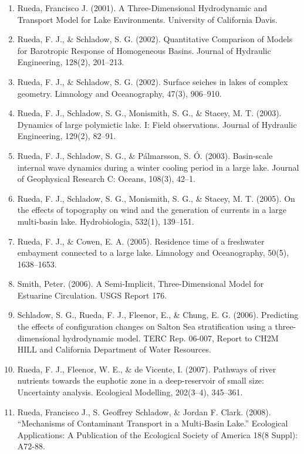 \begin{enumerate}
    \item Rueda, Francisco J. (2001). A Three-Dimensional Hydrodynamic and Transport Model for Lake Environments. University of California Davis.
    \item Rueda, F. J., \& Schladow, S. G. (2002). Quantitative Comparison of Models for Barotropic Response of Homogeneous Basins. Journal of Hydraulic Engineering, 128(2), 201–213.
    \item Rueda, F. J., \& Schladow, S. G. (2002). Surface seiches in lakes of complex geometry. Limnology and Oceanography, 47(3), 906–910.
    \item Rueda, F. J., Schladow, S. G., Monismith, S. G., \& Stacey, M. T. (2003). Dynamics of large polymictic lake. I: Field observations. Journal of Hydraulic Engineering, 129(2), 82–91.
    \item Rueda, F. J., Schladow, S. G., \& Pálmarsson, S. Ó. (2003). Basin-scale internal wave dynamics during a winter cooling period in a large lake. Journal of Geophysical Research C: Oceans, 108(3), 42–1.
    \item Rueda, F. J., Schladow, S. G., Monismith, S. G., \& Stacey, M. T. (2005). On the effects of topography on wind and the generation of currents in a large multi-basin lake. Hydrobiologia, 532(1), 139–151.
    \item Rueda, F. J., \& Cowen, E. A. (2005). Residence time of a freshwater embayment connected to a large lake. Limnology and Oceanography, 50(5), 1638–1653.
    \item Smith, Peter. (2006). A Semi-Implicit, Three-Dimensional Model for Estuarine Circulation. USGS Report 176.
    \item Schladow, S. G., Rueda, F. J., Fleenor, E., \& Chung, E. G. (2006). Predicting the effects of configuration changes on Salton Sea stratification using a three-dimensional hydrodynamic model. TERC Rep. 06-007, Report to CH2M HILL and California Department of Water Resources.
    \item Rueda, F. J., Fleenor, W. E., \& de Vicente, I. (2007). Pathways of river nutrients towards the euphotic zone in a deep-reservoir of small size: Uncertainty analysis. Ecological Modelling, 202(3–4), 345–361.
    \item Rueda, Francisco J., S. Geoffrey Schladow, \& Jordan F. Clark. (2008). “Mechanisms of Contaminant Transport in a Multi-Basin Lake.” Ecological Applications: A Publication of the Ecological Society of America 18(8 Suppl): A72-88.

\end{enumerate}

